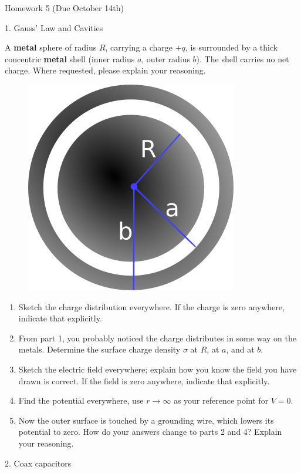 \documentclass[11pt]{article}
\def\tightlist{}
\begin{document}
{\LARGE Homework 5 (Due October
14th)}\label{homework-5-due-october-14th}

{1. Gauss' Law and Cavities}\label{gauss-law-and-cavities}

A \textbf{metal} sphere of radius \(R\), carrying a charge \(+q\), is
surrounded by a thick concentric \textbf{metal} shell (inner radius
\(a\), outer radius \(b\)). The shell carries no net charge. Where
requested, please explain your reasoning.

\begin{figure}[htbp]
\centering
\includegraphics[width=0.5\linewidth]{./images/hw5/concentric_spheres.png}
\end{figure}

\begin{enumerate}
\def\labelenumi{\arabic{enumi}.}
\tightlist
\item
  Sketch the charge distribution everywhere. If the charge is zero
  anywhere, indicate that explicitly.
\item
  From part 1, you probably noticed the charge distributes in some way
  on the metals. Determine the surface charge density \(\sigma\) at
  \(R\), at \(a\), and at \(b\).
\item
  Sketch the electric field everywhere; explain how you know the field
  you have drawn is correct. If the field is zero anywhere, indicate
  that explicitly.
\item
  Find the potential everywhere, use \(r \rightarrow \infty\) as your
  reference point for \(V=0\).
\item
  Now the outer surface is touched by a grounding wire, which lowers its
  potential to zero. How do your answers change to parts 2 and 4?
  Explain your reasoning.
\end{enumerate}

{2. Coax capacitors}\label{coax-capacitors}
\end{document}
